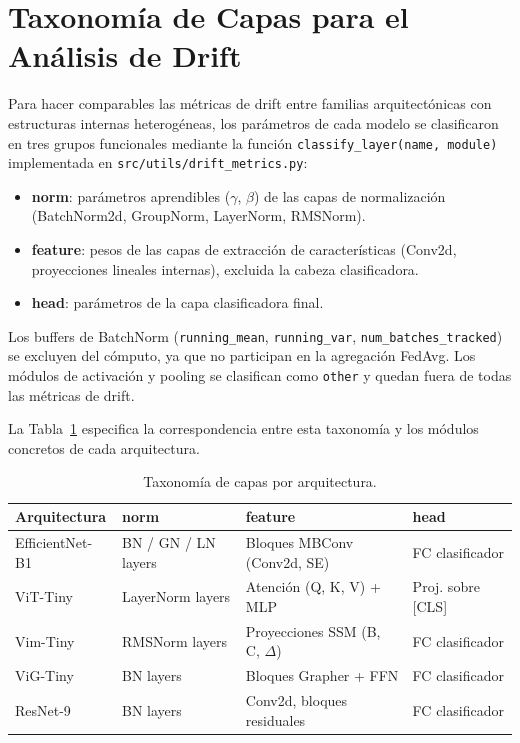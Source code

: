 \section{Taxonomía de Capas para el Análisis de Drift}

Para hacer comparables las métricas de drift entre familias arquitectónicas con estructuras
internas heterogéneas, los parámetros de cada modelo se clasificaron en tres grupos
funcionales mediante la función \texttt{classify\_layer(name, module)} implementada en
\texttt{src/utils/drift\_metrics.py}:

\begin{itemize}
  \item \textbf{norm}: parámetros aprendibles ($\gamma$, $\beta$) de las capas de
    normalización (BatchNorm2d, GroupNorm, LayerNorm, RMSNorm).
  \item \textbf{feature}: pesos de las capas de extracción de características
    (Conv2d, proyecciones lineales internas), excluida la cabeza clasificadora.
  \item \textbf{head}: parámetros de la capa clasificadora final.
\end{itemize}

Los buffers de BatchNorm (\texttt{running\_mean}, \texttt{running\_var},
\texttt{num\_batches\_tracked}) se excluyen del cómputo, ya que no participan en la
agregación FedAvg. Los módulos de activación y pooling se clasifican como \texttt{other}
y quedan fuera de todas las métricas de drift.

La Tabla~\ref{tab:layer_taxonomy} especifica la correspondencia entre esta taxonomía y los
módulos concretos de cada arquitectura.

\begin{table}[H]
\centering
\caption{Taxonomía de capas por arquitectura.}
\label{tab:layer_taxonomy}

\begin{tabularx}{\textwidth}{l l X l}
\hline
Arquitectura & \textbf{norm} & \textbf{feature} & \textbf{head} \\
\hline
EfficientNet-B1 & BN / GN / LN layers & Bloques MBConv (Conv2d, SE) & FC clasificador \\
ViT-Tiny & LayerNorm layers & Atención (Q, K, V) + MLP & Proj. sobre [CLS] \\
Vim-Tiny & RMSNorm layers & Proyecciones SSM (B, C, $\Delta$) & FC clasificador \\
ViG-Tiny & BN layers & Bloques Grapher + FFN & FC clasificador \\
ResNet-9 & BN layers & Conv2d, bloques residuales & FC clasificador \\
\hline
\end{tabularx}
\end{table}


